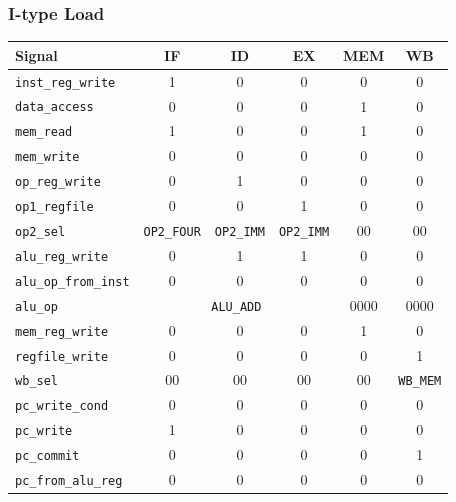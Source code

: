 \documentclass{scrartcl}
\begin{document}
\subsubsection{I-type Load}
\begin{tabularx}{\textwidth}{ | X | c | c | c | c | c | }
  \hline
  \textbf{Signal} & \textbf{IF} & \textbf{ID} & \textbf{EX} & \textbf{MEM} & \textbf{WB} \\ \hline
  \texttt{inst\_reg\_write} & 1 & 0 & 0 & 0 & 0 \\ \hline
  \texttt{data\_access} & 0 & 0 & 0 & 1 & 0 \\ \hline
  \texttt{mem\_read} & 1 & 0 & 0 & 1 & 0 \\ \hline
  \texttt{mem\_write} & 0 & 0 & 0 & 0 & 0 \\ \hline
  \texttt{op\_reg\_write} & 0 & 1 & 0 & 0 & 0 \\ \hline
  \texttt{op1\_regfile} & 0 & 0 & 1 & 0 & 0 \\ \hline
  \texttt{op2\_sel} & \texttt{OP2\_FOUR} & \texttt{OP2\_IMM} & \texttt{OP2\_IMM} & 00 & 00 \\ \hline
  \texttt{alu\_reg\_write} & 0 & 1 & 1 & 0 & 0 \\ \hline
  \texttt{alu\_op\_from\_inst} & 0 & 0 & 0 & 0 & 0 \\ \hline
  \texttt{alu\_op} & \multicolumn{3}{c|}{\texttt{ALU\_ADD}} & 0000 & 0000 \\ \hline
  \texttt{mem\_reg\_write} & 0 & 0 & 0 & 1 & 0 \\ \hline
  \texttt{regfile\_write} & 0 & 0 & 0 & 0 & 1 \\ \hline
  \texttt{wb\_sel} & 00 & 00 & 00 & 00 & \texttt{WB\_MEM} \\ \hline
  \texttt{pc\_write\_cond} & 0 & 0 & 0 & 0 & 0 \\ \hline
  \texttt{pc\_write} & 1 & 0 & 0 & 0 & 0 \\ \hline
  \texttt{pc\_commit} & 0 & 0 & 0 & 0 & 1 \\ \hline
  \texttt{pc\_from\_alu\_reg} & 0 & 0 & 0 & 0 & 0 \\ \hline
\end{tabularx}
\end{document}
